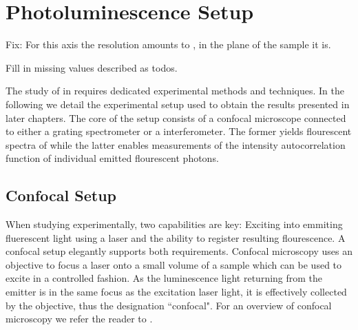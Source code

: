 
\chapter{Photoluminescence Setup}	\label{ch::pl_setup}

	\begin{remark}
		\item Fix: For this axis the resolution amounts to , in the plane of the sample it is.
		\item Fill in missing values described as todos.
	\end{remark}


	The study of \sivs in \nds requires dedicated experimental methods and techniques. In the following we detail the experimental setup used to obtain the results presented in later chapters. The core of the setup consists of a confocal microscope connected to either a grating spectrometer or a \HBT interferometer. The former yields flourescent spectra of \sivs while the latter enables measurements of the intensity autocorrelation function of individual emitted flourescent photons.

	\section{Confocal Setup} \label{sec::confocal}


		When studying \sivs experimentally, two capabilities are key: Exciting \sivs into emmiting fluerescent light using a laser and the ability to register resulting \siv flourescence. A confocal setup elegantly supports both requirements. Confocal microscopy uses an objective to focus a laser onto a small volume of a sample which can be used to excite \sivs in a controlled fashion. As the luminescence light returning from the emitter is in the same focus as the excitation laser light, it is effectively collected by the objective, thus the designation ``confocal". For an overview of confocal microscopy we refer the reader to \cite{janine::237}.

